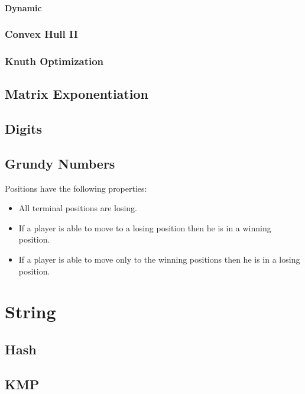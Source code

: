 \documentclass[10pt,a4paper]{report}
\begin{document}
			\subsubsection{Dynamic}
				
		\subsection{Convex Hull II}
		\subsection{Knuth Optimization}
	\newpage
	\section{Matrix Exponentiation}
		
	\newpage
	\section{Digits}
		
	\newpage
	\section{Grundy Numbers}
		Positions have the following properties:
		\begin{itemize}
			\item All terminal positions are losing.
			\item If a player is able to move to a losing position then he is in a winning position.
			\item If a player is able to move only to the winning positions then he is in a losing position.
		\end{itemize}
		
\chapter{String}
	\section{Hash}
		
	\newpage
	\section{KMP}
		
	\newpage
\end{document}
